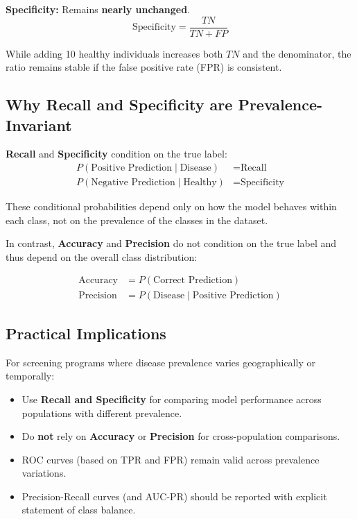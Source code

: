 \documentclass[11pt]{article}
\begin{document}
\textbf{Specificity:} Remains \textbf{nearly unchanged}.
\begin{equation}
    \text{Specificity} = \frac{TN}{TN + FP}
\end{equation}

While adding 10 healthy individuals increases both $TN$ and the denominator, the ratio remains stable if the false positive rate (FPR) is consistent.

\subsection{Why Recall and Specificity are Prevalence-Invariant}

\textbf{Recall} and \textbf{Specificity} condition on the true label:
\begin{align}
    P(\text{Positive Prediction} \mid \text{Disease}) &= \text{Recall} \\
    P(\text{Negative Prediction} \mid \text{Healthy}) &= \text{Specificity}
\end{align}

These conditional probabilities depend only on how the model behaves within each class, not on the prevalence of the classes in the dataset.

In contrast, \textbf{Accuracy} and \textbf{Precision} do not condition on the true label and thus depend on the overall class distribution:

\begin{align}
    \text{Accuracy} &= P(\text{Correct Prediction}) \\
    \text{Precision} &= P(\text{Disease} \mid \text{Positive Prediction})
\end{align}

\subsection{Practical Implications}

For screening programs where disease prevalence varies geographically or temporally:
\begin{itemize}
    \item Use \textbf{Recall and Specificity} for comparing model performance across populations with different prevalence.
    \item Do \textbf{not} rely on \textbf{Accuracy} or \textbf{Precision} for cross-population comparisons.
    \item ROC curves (based on TPR and FPR) remain valid across prevalence variations.
    \item Precision-Recall curves (and AUC-PR) should be reported with explicit statement of class balance.
\end{itemize}
\end{document}
